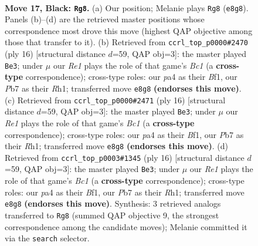 \documentclass[11pt]{article}
\begin{document}
\clearpage

\begin{figure}[p]\centering
\begin{subfigure}{0.46\textwidth}\centering
\resizebox{\linewidth}{!}{%
\newchessgame
\chessboard[
  setfen={rnb1r3/1p3ppp/1k2pn2/pNb5/P6P/1B2P3/1P1B1PP1/RN1R2K1 b - - 12 17},
  showmover=false,
  pgfstyle=straightmove, color=movearrow, markmove={e8-g8}
]}
\caption{}
\end{subfigure}\hfill
\begin{subfigure}{0.46\textwidth}\centering
\resizebox{\linewidth}{!}{%
\newchessgame
\chessboard[
  setfen={rnbr2k1/ppp2pbp/5np1/4p3/2P1P3/2N2N1P/PP3PP1/R1B1KB1R w KQ - 0 9},
  showmover=false,
  pgfstyle=straightmove, color=movearrow, markmove={c1-e3}
]}
\caption{}
\end{subfigure}
\\[4pt]
\begin{subfigure}{0.46\textwidth}\centering
\resizebox{\linewidth}{!}{%
\newchessgame
\chessboard[
  setfen={rnbr2k1/ppp2pbp/5np1/4p3/2P1P3/2N2N1P/PP3PP1/R1B1KB1R w KQ - 0 9},
  showmover=false,
  pgfstyle=straightmove, color=movearrow, markmove={c1-e3}
]}
\caption{}
\end{subfigure}\hfill
\begin{subfigure}{0.46\textwidth}\centering
\resizebox{\linewidth}{!}{%
\newchessgame
\chessboard[
  setfen={rnbr2k1/ppp2pbp/5np1/4p3/2P1P3/2N2N1P/PP3PP1/R1B1KB1R w KQ - 0 9},
  showmover=false,
  pgfstyle=straightmove, color=movearrow, markmove={c1-e3}
]}
\caption{}
\end{subfigure}
\caption{\textbf{Move 17, Black: \texttt{Rg8}.} (a) Our position; Melanie plays \texttt{Rg8} (\texttt{e8g8}). Panels (b)--(d) are the retrieved master positions whose correspondence most drove this move (highest QAP objective among those that transfer to it). (b) Retrieved from \texttt{ccrl\_top\_p0000\#2470} (ply 16) [structural distance $d$=59, QAP obj=3]: the master played \texttt{Be3}; under $\mu$ our \emph{Re1} plays the role of that game's \emph{Bc1} (a \textbf{cross-type} correspondence); cross-type roles: our \emph{p}a4 as their \emph{B}f1, our \emph{P}b7 as their \emph{R}h1; transferred move \texttt{e8g8} \textbf{(endorses this move)}. (c) Retrieved from \texttt{ccrl\_top\_p0000\#2471} (ply 16) [structural distance $d$=59, QAP obj=3]: the master played \texttt{Be3}; under $\mu$ our \emph{Re1} plays the role of that game's \emph{Bc1} (a \textbf{cross-type} correspondence); cross-type roles: our \emph{p}a4 as their \emph{B}f1, our \emph{P}b7 as their \emph{R}h1; transferred move \texttt{e8g8} \textbf{(endorses this move)}. (d) Retrieved from \texttt{ccrl\_top\_p0003\#1345} (ply 16) [structural distance $d$=59, QAP obj=3]: the master played \texttt{Be3}; under $\mu$ our \emph{Re1} plays the role of that game's \emph{Bc1} (a \textbf{cross-type} correspondence); cross-type roles: our \emph{p}a4 as their \emph{B}f1, our \emph{P}b7 as their \emph{R}h1; transferred move \texttt{e8g8} \textbf{(endorses this move)}. Synthesis: 3 retrieved analogs transferred to \texttt{Rg8} (summed QAP objective 9, the strongest correspondence among the candidate moves); Melanie committed it via the \texttt{search} selector.}
\label{fig:thought-m33}
\end{figure}
\end{document}

